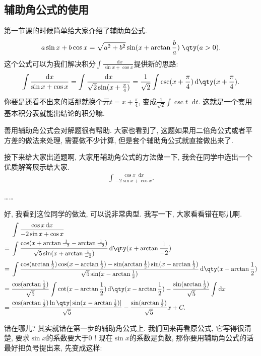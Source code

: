 \documentclass{ctexbook}
\newcommand*{\dif}{\mathop{}\!\mathrm{d}}
\begin{document}
{\subsection{辅助角公式的使用}
第一节课的时候简单给大家介绍了辅助角公式. 
\begin{align*}
a\sin{x}+b\cos{x}=\sqrt{a^{2}+b^{2}}\sin(x+\arctan{\frac{b}{a}})\;\qty(a>0)
.\end{align*}
这个公式可以为我们解决积分$\int\frac{\dif{x}}{\sin{x}+\cos{x}}$提供新的思路: 
\begin{align*}
\int\frac{\dif{x}}{\sin{x}+\cos{x}}=\int\frac{\dif{x}}{\sqrt{2}\sin(x+\frac{\pi}{4})}=\frac{1}{\sqrt{2}}\int\csc(x+\frac{\pi}{4})\dif{\qty(x+\frac{\pi}{4})}
.\end{align*}
你要是还看不出来的话那就换个元$t=x+\frac{\pi}{4}$, 变成$\frac{1}{\sqrt{2}}\int\csc{t}\dif{t}$. 这就是一个套用基本积分表就能出结论的积分嘛. \par
善用辅助角公式会对解题很有帮助. 大家也看到了, 这题如果用二倍角公式或者平方差的做法来处理, 需要做不少计算, 但是套个辅助角公式就直接做出来了. \par
接下来给大家出道题啊, 大家用辅助角公式的方法做一下, 我会在同学中选出一个优质解答展示给大家. 
\begin{align*}
\int\frac{\cos{x}\dif{x}}{-2\sin{x}+\cos{x}}
.\end{align*}\par
……\par
好, 我看到这位同学的做法, 可以说非常典型. 我写一下, 大家看看错在哪儿啊. 
\begin{align*}
{}&\int\frac{\cos{x}\dif{x}}{-2\sin{x}+\cos{x}}\\
={}&\int\frac{\cos(x+\arctan{\frac{1}{-2}}-\arctan{\frac{1}{-2}})}{\sqrt{5}\sin(x+\arctan{\frac{1}{-2}})}\dif{\qty(x+\arctan{\frac{1}{-2}})}\\
={}&\int\frac{\cos(\arctan{\frac{1}{2}})\cos(x-\arctan{\frac{1}{2}})-\sin(\arctan{\frac{1}{2}})\sin(x-\arctan{\frac{1}{2}})}{\sqrt{5}\sin(x-\arctan{\frac{1}{2}})}\dif{\qty(x-\arctan{\frac{1}{2}})}\\
={}&\frac{\cos(\arctan{\frac{1}{2}})}{\sqrt{5}}\int\cot(x-\arctan{\frac{1}{2}})\dif{\qty(x-\arctan{\frac{1}{2}})}-\frac{\sin(\arctan{\frac{1}{2}})}{\sqrt{5}}\int\dif{x}\\
={}&\frac{\cos(\arctan{\frac{1}{2}})\ln\qty|\sin(x-\arctan{\frac{1}{2}})|}{\sqrt{5}}-\frac{\sin(\arctan{\frac{1}{2}})}{\sqrt{5}}x+C
.\end{align*}\par
错在哪儿? 其实就错在第一步的辅助角公式上. 我们回来再看原公式, 它写得很清楚, 要求$\sin{x}$的系数要大于$0$ ! 现在$\sin{x}$的系数是负数, 那你要用辅助角公式的话最好把负号提出来, 先变成这样: 
}
\end{document}
